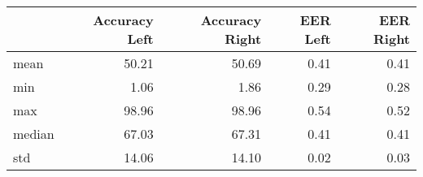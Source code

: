 \begin{tabular}{lrrrr}
\toprule
{} &  Accuracy Left &  Accuracy Right &  EER Left &  EER Right \\
\midrule
mean   &          50.21 &           50.69 &      0.41 &       0.41 \\
min    &           1.06 &            1.86 &      0.29 &       0.28 \\
max    &          98.96 &           98.96 &      0.54 &       0.52 \\
median &          67.03 &           67.31 &      0.41 &       0.41 \\
std    &          14.06 &           14.10 &      0.02 &       0.03 \\
\bottomrule
\end{tabular}
